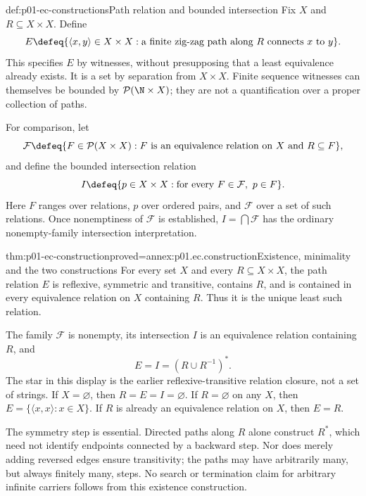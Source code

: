 \begin{hbdefinition}{def:p01-ec-constructions}{Path relation and bounded intersection}
Fix \(X\) and \(R\subseteq X\times X\). Define
\[
 E\defeq\{\langle x,y\rangle\in X\times X:
       \text{a finite zig-zag path along }R\text{ connects }x\text{ to }y\}.
\]
This specifies \(E\) by witnesses, without presupposing that a least
equivalence already exists. It is a set by separation from \(X\times X\).
Finite sequence witnesses can themselves be bounded by
\(\mathcal P(\N\times X)\); they are not a quantification over a
proper collection of paths.

For comparison, let
\[
 \mathcal F\defeq\{F\in\mathcal P(X\times X):
       F\text{ is an equivalence relation on }X\text{ and }R\subseteq F\},
\]
and define the bounded intersection relation
\[
 I\defeq\{p\in X\times X:\text{for every }F\in\mathcal F,
                                      \ p\in F\}.
\]
Here \(F\) ranges over relations, \(p\) over ordered pairs, and
\(\mathcal F\) over a set of such relations. Once nonemptiness of
\(\mathcal F\) is established, \(I=\bigcap\mathcal F\) has the
ordinary nonempty-family intersection interpretation.
\end{hbdefinition}

\begin{hbtheorem}{thm:p01-ec-construction}{proved=annex:p01.ec.construction}{Existence, minimality and the two constructions}
For every set \(X\) and every \(R\subseteq X\times X\), the path
relation \(E\) is reflexive, symmetric and transitive, contains \(R\),
and is contained in every equivalence relation on \(X\) containing \(R\).
Thus it is the unique least such relation.

The family \(\mathcal F\) is nonempty, its intersection \(I\) is an
equivalence relation containing \(R\), and
\[
 E=I=(R\cup R^{-1})^*.
\]
The star in this display is the earlier reflexive-transitive relation
closure, not a set of strings. If \(X=\varnothing\), then
\(R=E=I=\varnothing\). If \(R=\varnothing\) on any \(X\), then
\(E=\{\langle x,x\rangle:x\in X\}\). If \(R\) is already an
equivalence relation on \(X\), then \(E=R\).
\end{hbtheorem}

The symmetry step is essential. Directed paths along \(R\) alone
construct \(R^*\), which need not identify endpoints connected by a
backward step. Nor does merely adding reversed edges ensure transitivity;
the paths may have arbitrarily many, but always finitely many, steps.
No search or termination claim for arbitrary infinite carriers follows
from this existence construction.

